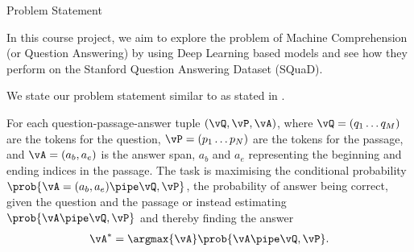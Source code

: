 \documentclass{article}
\begin{document}
\begin{psection}{Problem Statement}

	In this course project, we aim to explore the problem of Machine Comprehension (or Question Answering) by using Deep Learning based models and see how they perform on the Stanford Question Answering Dataset (SQuaD).

	We state our problem statement similar to as stated in \citep{squad}.

	For each question-passage-answer tuple $(\vQ, \vP, \vA)$, where $\vQ = (q_1 \dots q_M)$ are the tokens for the question, $\vP = (p_1 \dots p_N)$ are the tokens for the passage, and $\vA = (a_b, a_e)$ is the answer span, $a_b$ and $a_e$ representing the beginning and ending indices in the passage.
	The task is maximising the conditional probability $\prob{\vA = (a_b, a_e) \pipe \vQ, \vP}$, \ie the probability of answer being correct, given the question and the passage or instead estimating $\prob{\vA \pipe \vQ, \vP}$ and thereby finding the answer
	\begin{align*}
		\vA^\ast = \argmax{\vA} \prob{\vA \pipe \vQ, \vP}.
	\end{align*}

\end{psection}
\end{document}
